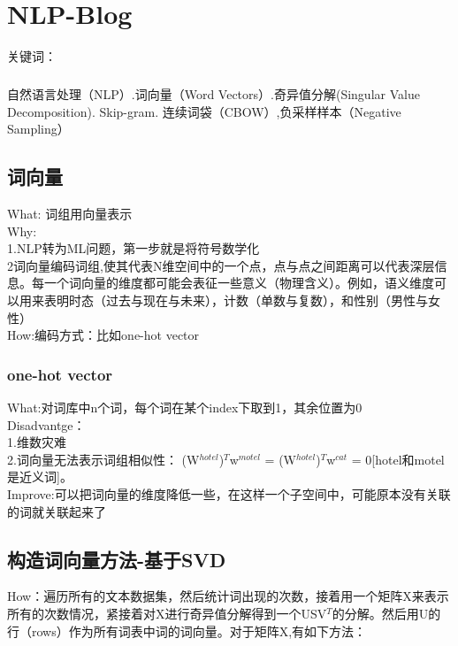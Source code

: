 \documentclass[
10pt, %
a4paper, %
oneside, %
headinclude,footinclude, %
BCOR5mm, %
]{scrartcl}
\begin{document}


\newpage %




\section{NLP-Blog}
关键词：\subparagraph{}自然语言处理（NLP）.词向量（Word Vectors）.奇异值分解(Singular Value Decomposition). Skip-gram. 连续词袋（CBOW）,负采样样本（Negative Sampling）
\subsection{\color{red}词向量}
What: 词组用向量表示
\\Why:\\\indent1.NLP转为ML问题，第一步就是将符号数学化\\\indent2词向量编码词组,使其代表N维空间中的一个点，点与点之间距离可以代表深层信息。每一个词向量的维度都可能会表征一些意义（物理含义）。例如，语义维度可以用来表明时态（过去与现在与未来），计数（单数与复数），和性别（男性与女性）
\\How:编码方式：比如one-hot vector
\subsubsection{\color{blue}one-hot vector}
What:对词库中n个词，每个词在某个index下取到1，其余位置为0
\\Disadvantge：\\\indent1.维数灾难\\\indent2.词向量无法表示词组相似性： (W$^{hotel}$)$^T$w$^{motel}$ = (W$^{hotel}$)$^T$w$^{cat}$ = 0[hotel和motel是近义词]。
\\Improve:可以把词向量的维度降低一些，在这样一个子空间中，可能原本没有关联的词就关联起来了
\subsection{\color{red}构造词向量方法-基于SVD}
How：遍历所有的文本数据集，然后统计词出现的次数，接着用一个矩阵X来表示所有的次数情况，紧接着对X进行奇异值分解得到一个USV$^T$的分解。然后用U的行（rows）作为所有词表中词的词向量。对于矩阵X,有如下方法：
\end{document}
